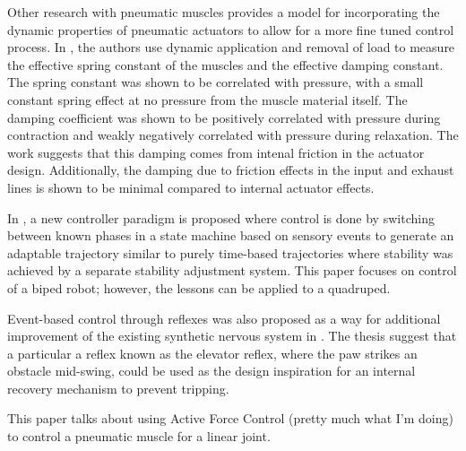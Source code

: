 Other research with pneumatic muscles provides a model for incorporating the
dynamic properties of pneumatic actuators to allow for a more fine tuned control
process. In \cite{DynamicPMuscles}, the authors use dynamic application and
removal of load to measure the effective spring constant of the muscles and the
effective damping constant. The spring constant was shown to be correlated with
pressure, with a small constant spring effect at no pressure from the muscle
material itself. The damping coefficient was shown to be positively correlated
with pressure during contraction and weakly negatively correlated with pressure
during relaxation. The work suggests that this damping comes from intenal
friction in the actuator design. Additionally, the damping due to friction
effects in the input and exhaust lines is shown to be minimal compared to
internal actuator effects. \cite{DynamicPMuscles}

\cite{einstein}





In \cite{EventBasedWalking}, a new controller paradigm is proposed where control
is done by switching between known phases in a state machine based on sensory
events to generate an adaptable trajectory similar to purely time-based
trajectories where stability was achieved by a separate stability adjustment
system. This paper focuses on control of a biped robot; however, the lessons can
be applied to a quadruped.

Event-based control through reflexes was also proposed as a way for additional
improvement of the existing synthetic nervous system in \cite{HuntPhDThesis}.
The thesis suggest that a particular a reflex known as the elevator reflex,
where the paw strikes an
obstacle mid-swing, could be used as the design inspiration for an internal recovery
mechanism to prevent tripping.


This paper talks about using Active Force Control (pretty much what I'm doing)
to control a pneumatic muscle for a linear joint.
\cite{Jahanabadi2009}

